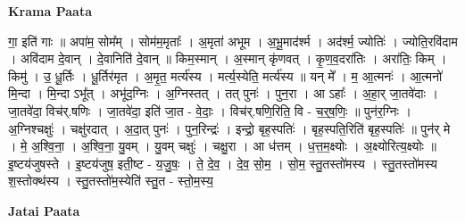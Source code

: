 \documentclass[17pt]{extarticle}
\begin{document}
\textbf{Krama Paata} \newline

गा॒ इति॑ गाः ॥ अपा॑म॒ सोम᳚म् । सोम॑म॒मृताः᳚ । अ॒मृता॑ अभूम । अ॒भू॒माद॑र्श्म । अद॑र्श्म॒ ज्योतिः॑ । ज्योति॒रवि॑दाम । अवि॑दाम दे॒वान् । दे॒वानिति॑ दे॒वान् ॥ किम॒स्मान् । अ॒स्मान् कृ॑णवत् । कृ॒ण॒व॒दरा॑तिः । अरा॑तिः॒ किम् । किमु॑ । उ॒ धू॒र्तिः । धू॒र्तिर॑मृत । अ॒मृ॒त॒ मर्त्य॑स्य । मर्त्य॒स्येति॒ मर्त्य॑स्य ॥ यन् मे᳚ । म॒ आ॒त्मनः॑ । आ॒त्मनो॑ मि॒न्दा । मि॒न्दा ऽभू᳚त् । अभू॑द॒ग्निः । अ॒ग्निस्तत् । तत् पुनः॑ । पुन॒रा । आ ऽहाः᳚ । अ॒हा॒र् जा॒तवे॑दाः । जा॒तवे॑दा॒ विच॑र्.षणिः । जा॒तवे॑दा॒ इति॑ जा॒त - वे॒दाः॒ । विच॑र्.षणि॒रिति॒ वि - च॒र्॒ष॒णिः॒ ॥ पुन॑र॒ग्निः । अ॒ग्निश्चक्षुः॑ । चक्षु॑रदात् । अ॒दा॒त् पुनः॑ । पुन॒रिन्द्रः॑ । इन्द्रो॒ बृह॒स्पतिः॑ । बृह॒स्पति॒रिति॑ बृह॒स्पतिः॑ ॥ पुन॑र् मे । मे॒ अ॒श्वि॒ना॒ । अ॒श्वि॒ना॒ यु॒वम् । यु॒वम् चक्षुः॑ । चक्षु॒रा । आ ध॑त्तम् । ध॒त्त॒म॒क्ष्योः । अ॒क्ष्योरित्य॒क्ष्योः ॥ इ॒ष्टय॑जुषस्ते । इ॒ष्टय॑जुष॒ इती॒ष्ट - य॒जु॒षः॒ । ते॒ दे॒व॒ । दे॒व॒ सो॒म॒ । सो॒म॒ स्तु॒तस्तो॑मस्य । स्तु॒तस्तो॑मस्य श॒स्तोक्थ॑स्य । स्तु॒तस्तो॑म॒स्येति॑ स्तु॒त - स्तो॒म॒स्य॒ \newline

\textbf{Jatai Paata} \newline
\end{document}
